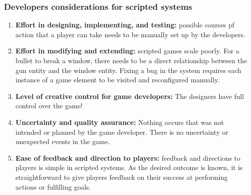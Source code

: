   \subsubsection*{Developers considerations for scripted systems}
    \begin{enumerate}
      \item {\bf Effort in designing, implementing, and testing:} possible courses pf action that a player can take needs to be manually set up by the developers.
      \item {\bf Effort in modifying and extending:} scripted games scale poorly. For a bullet to break a window, there needs to be a direct relationship between the gun entity and the window entity. Fixing a bug in the system requires each instance of a game element to be visited and reconfigured manually. 
      \item {\bf Level of creative control for game developers:} The designers have full control over the game!
      \item {\bf Uncertainty and quality assurance:} Nothing occurs that was not intended or planned by the game developer. There is no uncertainty or unexpected events in the game. 
      \item {\bf Ease of feedback and direction to players:} feedback and directions to players is simple in scripted systems. As the desired outcome is known, it is straightforward to give players feedback on their success at performing actions or fulfilling goals. 
    \end{enumerate}


